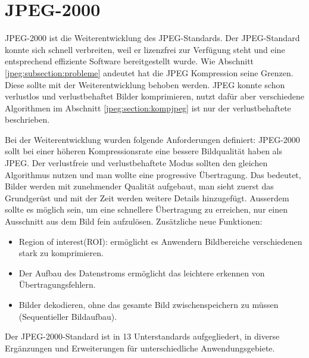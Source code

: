 %
%
%
%
\section{JPEG-2000 
\label{jpeg:section:jpeg2000}}
JPEG-2000 ist die Weiterentwicklung des JPEG-Standards.
Der JPEG-Standard konnte sich schnell verbreiten, weil er lizenzfrei zur Verfügung steht und eine entsprechend effiziente Software bereitgestellt wurde.
Wie Abschnitt \ref{jpeg:subsection:probleme} andeutet hat die JPEG Kompression seine Grenzen.
Diese sollte mit der Weiterentwicklung behoben werden. 
JPEG konnte schon verlustlos und verlustbehaftet Bilder komprimieren, nutzt dafür aber verschiedene Algorithmen im Abschnitt \ref{jpeg:section:kompjpeg} ist nur der verlustbehaftete beschrieben.

Bei der Weiterentwicklung wurden folgende Anforderungen definiert:
JPEG-2000 sollt bei einer höheren Kompressionsrate eine bessere Bildqualität haben als JPEG.
Der verlustfreie und verlustbehaftete Modus sollten den gleichen Algorithmus nutzen und man wollte eine progressive Übertragung.
Das bedeutet, Bilder werden mit zunehmender Qualität aufgebaut, man sieht zuerst das Grundgerüst und mit der Zeit werden weitere Details hinzugefügt.
Ausserdem sollte es möglich sein, um eine schnellere Übertragung zu erreichen, nur einen Ausschnitt aus dem Bild fein aufzulösen.
Zusätzliche neue Funktionen:
\begin{itemize}
    \item Region of interest(ROI): ermöglicht es Anwendern Bildbereiche verschiedenen stark zu komprimieren.
    \item Der Aufbau des Datenstroms ermöglicht das leichtere erkennen von Übertragungsfehlern.
    \item Bilder dekodieren, ohne das gesamte Bild zwischenspeichern zu müssen (Sequentieller Bildaufbau).
\end{itemize}
Der JPEG-2000-Standard ist in 13 Unterstandards aufgegliedert, in diverse Ergänzungen und Erweiterungen für unterschiedliche Anwendungsgebiete. 


